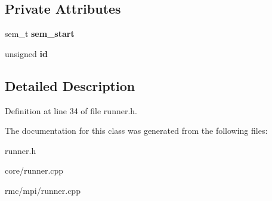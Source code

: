 \subsection*{Private Attributes}
\begin{CompactItemize}
\item 
sem\_\-t {\bf sem\_\-start}\label{class_runner_4b0827d5df2df632db4ab71dd55e81b2}

\item 
unsigned {\bf id}\label{class_runner_1989c1f8e0b0b54ad2e60a341007e59d}

\end{CompactItemize}


\subsection{Detailed Description}




Definition at line 34 of file runner.h.

The documentation for this class was generated from the following files:\begin{CompactItemize}
\item 
runner.h\item 
core/runner.cpp\item 
rmc/mpi/runner.cpp\end{CompactItemize}
